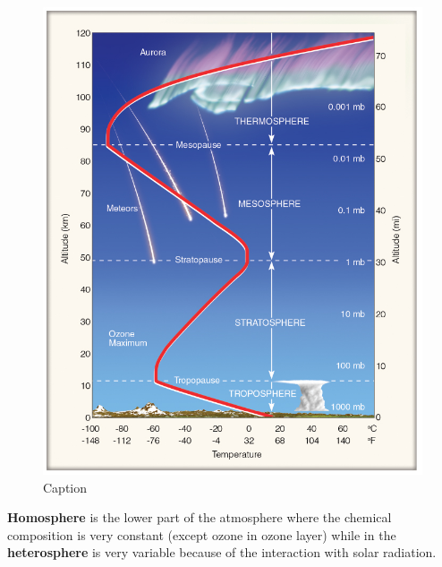 \documentclass[oneside]{book}
\begin{document}
\begin{figure}

{\centering \includegraphics[width=0.8\linewidth]{figures/Figure13} 

}

\caption{Caption}\label{fig:Layer2}
\end{figure}

\textbf{Homosphere} is the lower part of the atmosphere where the
chemical composition is very constant (except ozone in ozone layer)
while in the \textbf{heterosphere} is very variable because of the
interaction with solar radiation.
\end{document}
